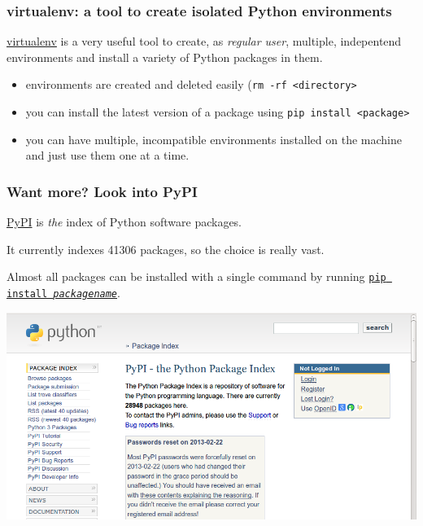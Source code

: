 \documentclass[english,serif,mathserif,xcolor=pdftex,dvipsnames,table]{beamer}
\begin{document}
\begin{frame}
  \frametitle{virtualenv: a tool to create isolated Python environments}

  \href{https://pypi.python.org/pypi/virtualenv}{virtualenv} is a very
  useful tool to create, as \textit{regular user}, multiple,
  indepentend environments and install a variety of Python packages in
  them.

  \begin{itemize}
  \item environments are created and deleted easily (\texttt{rm -rf <directory>}
  \item you can install the latest version of a package using
    \texttt{pip install <package>}
  \item you can have multiple, incompatible environments installed on
    the machine and just use them one at a time.
  \end{itemize}
\end{frame}


\begin{frame}
  \frametitle{Want more? Look into PyPI}

  \href{http://pypi.python.org}{PyPI} is \emph{the} index of Python software packages.

  \+ It currently indexes 41306 packages, so the choice is really vast.

  \+ Almost all packages can be installed with a single command by
  running \href{https://pypi.python.org/pypi/pip}{\texttt{pip install
    \emph{packagename}}}.

\includegraphics[width=1\textwidth]{fig/pypi_screenshot.png}
\end{frame}
\end{document}
